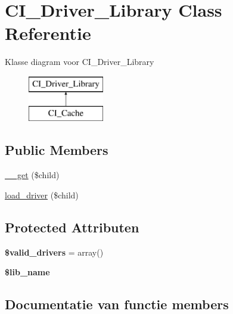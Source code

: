 \hypertarget{class_c_i___driver___library}{}\section{C\+I\+\_\+\+Driver\+\_\+\+Library Class Referentie}
\label{class_c_i___driver___library}
Klasse diagram voor C\+I\+\_\+\+Driver\+\_\+\+Library\begin{figure}[H]
\begin{center}
\leavevmode
\includegraphics[height=2.000000cm]{class_c_i___driver___library}
\end{center}
\end{figure}
\subsection*{Public Members}
\begin{DoxyCompactItemize}
\item 
\mbox{\hyperlink{class_c_i___driver___library_a2fac4d4694e05e7eeba5282bd6ff8caf}{\+\_\+\+\_\+get}} (\$child)
\item 
\mbox{\hyperlink{class_c_i___driver___library_a7cc2908487e106164664ef7d743690b8}{load\+\_\+driver}} (\$child)
\end{DoxyCompactItemize}
\subsection*{Protected Attributen}
\begin{DoxyCompactItemize}
\item 
\mbox{\label{class_c_i___driver___library_a32d963b3d49fd67f188c1a74d38be6df}} 
{\bfseries \$valid\+\_\+drivers} = array()
\item 
\mbox{\label{class_c_i___driver___library_ab820c27413d5904686c58f6b2941b603}} 
{\bfseries \$lib\+\_\+name}
\end{DoxyCompactItemize}


\subsection{Documentatie van functie members}
\mbox{\label{class_c_i___driver___library_a2fac4d4694e05e7eeba5282bd6ff8caf}} 
